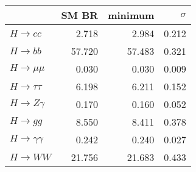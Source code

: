 \begin{tabular}{lrrr}
\toprule
{} &  SM BR &  minimum &  $\sigma$ \\
\midrule
$H\to cc$           &  2.718 &    2.984 &     0.212 \\
$H\to bb$           & 57.720 &   57.483 &     0.321 \\
$H\to \mu\mu$       &  0.030 &    0.030 &     0.009 \\
$H\to \tau\tau$     &  6.198 &    6.211 &     0.152 \\
$H\to Z\gamma$      &  0.170 &    0.160 &     0.052 \\
$H\to gg$           &  8.550 &    8.411 &     0.378 \\
$H\to \gamma\gamma$ &  0.242 &    0.240 &     0.027 \\
$H\to WW$           & 21.756 &   21.683 &     0.433 \\
\bottomrule
\end{tabular}
